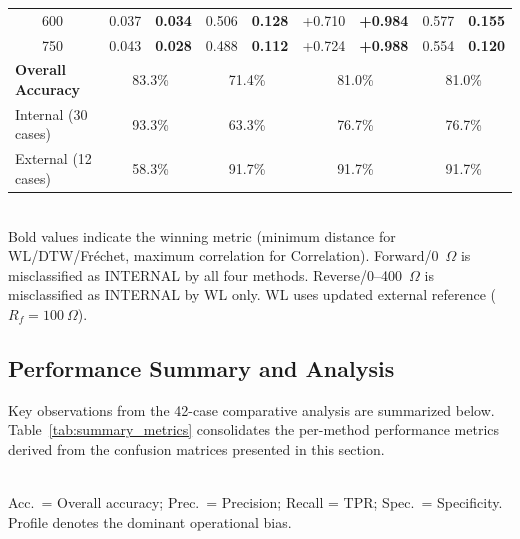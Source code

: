\documentclass[journal]{IEEEtran}
\begin{document}
\begin{table}[!t]
\begin{tabular}{@{}llcccccccc@{}}
        & 600 & 0.037 & \textbf{0.034} & 0.506 & \textbf{0.128} & +0.710 & \textbf{+0.984} & 0.577 & \textbf{0.155} \\
        & 750 & 0.043 & \textbf{0.028} & 0.488 & \textbf{0.112} & +0.724 & \textbf{+0.988} & 0.554 & \textbf{0.120} \\
\midrule
\multicolumn{2}{l}{\textbf{Overall Accuracy}} & \multicolumn{2}{c}{83.3\%} & \multicolumn{2}{c}{71.4\%} & \multicolumn{2}{c}{81.0\%} & \multicolumn{2}{c}{81.0\%} \\
\multicolumn{2}{l}{Internal (30 cases)} & \multicolumn{2}{c}{93.3\%} & \multicolumn{2}{c}{63.3\%} & \multicolumn{2}{c}{76.7\%} & \multicolumn{2}{c}{76.7\%} \\
\multicolumn{2}{l}{External (12 cases)} & \multicolumn{2}{c}{58.3\%} & \multicolumn{2}{c}{91.7\%} & \multicolumn{2}{c}{91.7\%} & \multicolumn{2}{c}{91.7\%} \\
\bottomrule
\end{tabular}
\\[0.5em]
\footnotesize{Bold values indicate the winning metric (minimum distance for WL/DTW/Fréchet, maximum correlation for Correlation). Forward/0~$\Omega$ is misclassified as INTERNAL by all four methods. Reverse/0--400~$\Omega$ is misclassified as INTERNAL by WL only. WL uses updated external reference ($R_f=100~\Omega$).}
\end{table}

\subsection{Performance Summary and Analysis}

Key observations from the 42-case comparative analysis are summarized
below. Table~\ref{tab:summary_metrics} consolidates the per-method
performance metrics derived from the confusion matrices presented in
this section.

\begin{table}[!t]
\centering
\caption{Performance Metrics Summary: All Four Individual Methods (42 Cases)}
\label{tab:summary_metrics}
\\[0.5em]
\footnotesize{Acc.\ = Overall accuracy; Prec.\ = Precision; Recall = TPR;
Spec.\ = Specificity. Profile denotes the dominant operational bias.}
\end{table}
\end{document}
